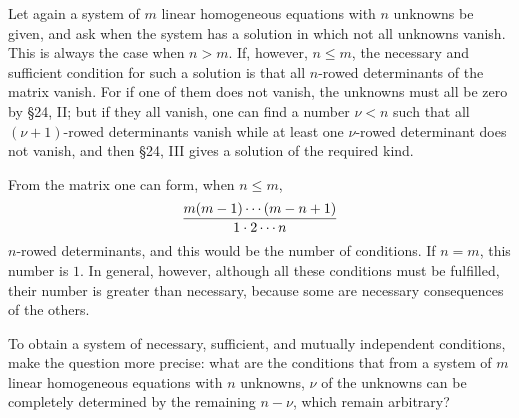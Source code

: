 \documentclass[11pt]{article}
\begin{document}
Let again a system of \(m\) linear homogeneous equations with \(n\) unknowns be given, and ask when the system has a solution in which not all unknowns vanish.  This is always the case when \(n>m\).  If, however, \(n\le m\), the necessary and sufficient condition for such a solution is that all \(n\)-rowed determinants of the matrix vanish.  For if one of them does not vanish, the unknowns must all be zero by \S 24, II; but if they all vanish, one can find a number \(\nu<n\) such that all \((\nu+1)\)-rowed determinants vanish while at least one \(\nu\)-rowed determinant does not vanish, and then \S 24, III gives a solution of the required kind.

From the matrix one can form, when \(n\le m\),
\[
        {m(m-1)\cdots(m-n+1)\over 1\cdot2\cdots n}
\]
\(n\)-rowed determinants, and this would be the number of conditions.  If \(n=m\), this number is \(1\).  In general, however, although all these conditions must be fulfilled, their number is greater than necessary, because some are necessary consequences of the others.

To obtain a system of necessary, sufficient, and mutually independent conditions, make the question more precise: what are the conditions that from a system of \(m\) linear homogeneous equations with \(n\) unknowns, \(\nu\) of the unknowns can be completely determined by the remaining \(n-\nu\), which remain arbitrary?
\end{document}
